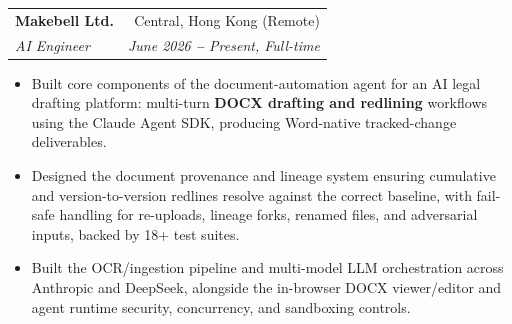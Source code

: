 \documentclass[a4paper,11pt]{article}
\makeatletter
\newcommand{\resumeItem}[1]{
  \item\small{\justifying #1 \vspace{-2pt}}
}
\newcommand{\resumeSubheading}[4]{
  \vspace{-2pt}\item
    \begin{tabular*}{0.97\textwidth}[t]{l@{\extracolsep{\fill}}r}
      \textbf{#1} & #2 \\
      \textit{\small#3} & \textit{\small #4} \\
    \end{tabular*}\vspace{-7pt}
}
\newcommand{\resumeItemListStart}{\begin{itemize}[leftmargin=0.2in]}
\newcommand{\resumeItemListEnd}{\end{itemize}\vspace{-5pt}}
\makeatother
\begin{document}
\resumeSubheading
{Makebell Ltd.}{Central, Hong Kong (Remote)}
{AI Engineer}{June 2026 \textbf{--} Present, Full-time}
\resumeItemListStart
\resumeItem{Built core components of the document-automation agent for an AI legal drafting platform: multi-turn \textbf{DOCX drafting and redlining} workflows using the Claude Agent SDK, producing Word-native tracked-change deliverables.}
\resumeItem{Designed the document provenance and lineage system ensuring cumulative and version-to-version redlines resolve against the correct baseline, with fail-safe handling for re-uploads, lineage forks, renamed files, and adversarial inputs, backed by 18+ test suites.}
\resumeItem{Built the OCR/ingestion pipeline and multi-model LLM orchestration across Anthropic and DeepSeek, alongside the in-browser DOCX viewer/editor and agent runtime security, concurrency, and sandboxing controls.}
\resumeItemListEnd
\end{document}
